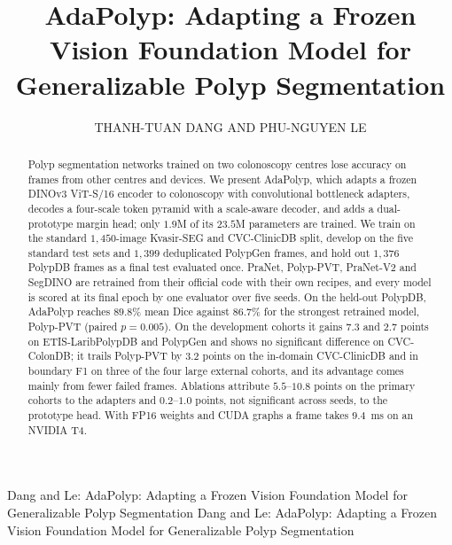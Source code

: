 \documentclass{ieeeaccess}
\begin{document}

\title{AdaPolyp: Adapting a Frozen Vision Foundation Model for Generalizable Polyp Segmentation}
\author{\uppercase{Thanh-Tuan Dang}
AND \uppercase{Phu-Nguyen Le}}

\address[1]{Department of Artificial Intelligence, FPT University, Ho Chi Minh City 71300, Vietnam (e-mail: tuandtse196418@fpt.edu.vn)}
\address[2]{Faculty of Electrical and Electronics Engineering, Vietnam Aerospace University, 104 Nguyen Van Troi Street, Phu Nhuan Ward, Ho Chi Minh City 700000, Vietnam (e-mail: nguyenlp@vaa.edu.vn)}

\markboth
{Dang and Le: AdaPolyp: Adapting a Frozen Vision Foundation Model for Generalizable Polyp Segmentation}
{Dang and Le: AdaPolyp: Adapting a Frozen Vision Foundation Model for Generalizable Polyp Segmentation}


\begin{abstract}
Polyp segmentation networks trained on two colonoscopy centres lose accuracy on frames from other centres and devices. We present AdaPolyp, which adapts a frozen DINOv3 ViT-S/16 encoder to colonoscopy with convolutional bottleneck adapters, decodes a four-scale token pyramid with a scale-aware decoder, and adds a dual-prototype margin head; only $1.9$M of its $23.5$M parameters are trained. We train on the standard $1{,}450$-image Kvasir-SEG and CVC-ClinicDB split, develop on the five standard test sets and $1{,}399$ deduplicated PolypGen frames, and hold out $1{,}376$ PolypDB frames as a final test evaluated once. PraNet, Polyp-PVT, PraNet-V2 and SegDINO are retrained from their official code with their own recipes, and every model is scored at its final epoch by one evaluator over five seeds. On the held-out PolypDB, AdaPolyp reaches $89.8\%$ mean Dice against $86.7\%$ for the strongest retrained model, Polyp-PVT (paired $p=0.005$). On the development cohorts it gains $7.3$ and $2.7$ points on ETIS-LaribPolypDB and PolypGen and shows no significant difference on CVC-ColonDB; it trails Polyp-PVT by $3.2$ points on the in-domain CVC-ClinicDB and in boundary F1 on three of the four large external cohorts, and its advantage comes mainly from fewer failed frames. Ablations attribute $5.5$--$10.8$ points on the primary cohorts to the adapters and $0.2$--$1.0$ points, not significant across seeds, to the prototype head. With FP16 weights and CUDA graphs a frame takes $9.4$~ms on an NVIDIA T4.
\end{abstract}
\end{document}
